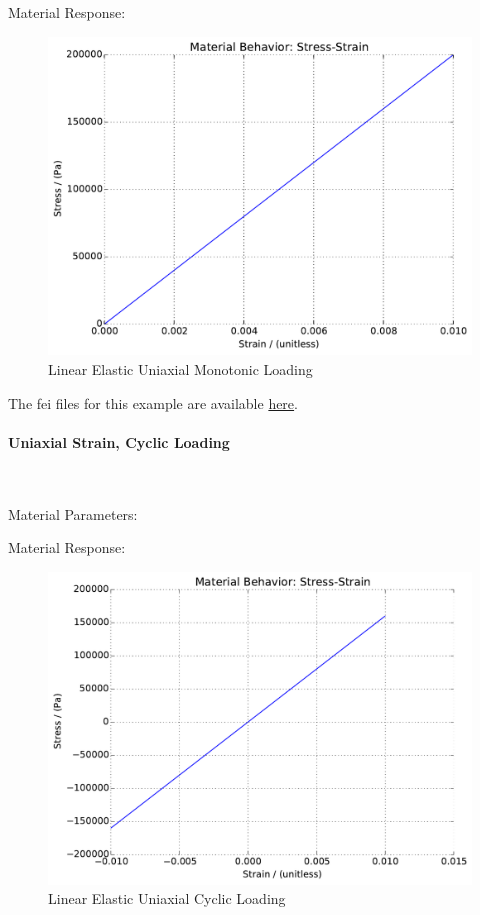 \documentclass[fleqn,11pt]{article}
\begin{document}
Material Response:
\begin{figure}[H]
\begin{center}
\includegraphics[width=12cm]{../fei_examples/linear_elastic/3uniaxial_strain_mono_loading/result.pdf}
\caption{
\label{Linear Elastic Uniaxial Monotonic Loading}
Linear Elastic Uniaxial Monotonic Loading}
\end{center}
\end{figure}

The fei files for this example are available \href{https://github.com/yuan-energy/education_examples/tree/master/fei_examples/linear_elastic/3uniaxial_strain_mono_loading}{here}.

\newpage
\paragraph{Uniaxial Strain, Cyclic Loading} ~

Material Parameters:


Material Response:
\begin{figure}[H]
\begin{center}
\includegraphics[width=12cm]{../fei_examples/linear_elastic/2pure_shear_cyclic_loading/result.pdf}
\caption{
\label{Linear Elastic Uniaxial Cyclic Loading}
Linear Elastic Uniaxial Cyclic Loading}
\end{center}
\end{figure}
\end{document}
